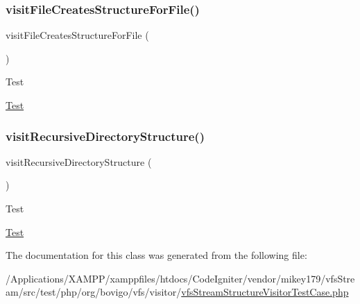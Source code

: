 \subsubsection{\texorpdfstring{visit\+File\+Creates\+Structure\+For\+File()}{visitFileCreatesStructureForFile()}}
{\footnotesize\ttfamily visit\+File\+Creates\+Structure\+For\+File (\begin{DoxyParamCaption}{ }\end{DoxyParamCaption})}

\begin{DoxyRefDesc}{Test}
\item[\mbox{\hyperlink{test__test000299}{Test}}]\end{DoxyRefDesc}
\mbox{\label{classorg_1_1bovigo_1_1vfs_1_1visitor_1_1vfs_stream_structure_visitor_test_case_a202111a702388c51ecd2374ffc20fa6c}} 
\subsubsection{\texorpdfstring{visit\+Recursive\+Directory\+Structure()}{visitRecursiveDirectoryStructure()}}
{\footnotesize\ttfamily visit\+Recursive\+Directory\+Structure (\begin{DoxyParamCaption}{ }\end{DoxyParamCaption})}

\begin{DoxyRefDesc}{Test}
\item[\mbox{\hyperlink{test__test000301}{Test}}]\end{DoxyRefDesc}


The documentation for this class was generated from the following file\+:\begin{DoxyCompactItemize}
\item 
/\+Applications/\+X\+A\+M\+P\+P/xamppfiles/htdocs/\+Code\+Igniter/vendor/mikey179/vfs\+Stream/src/test/php/org/bovigo/vfs/visitor/\mbox{\hyperlink{vfs_stream_structure_visitor_test_case_8php}{vfs\+Stream\+Structure\+Visitor\+Test\+Case.\+php}}\end{DoxyCompactItemize}
